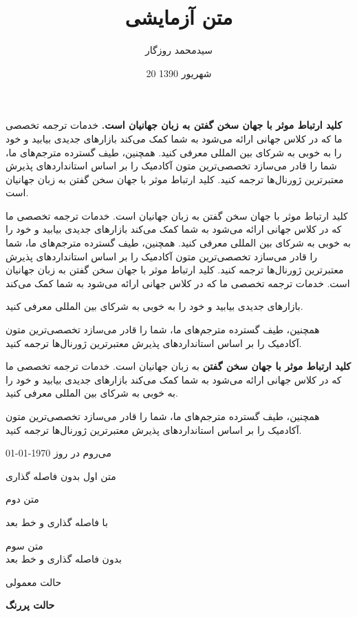 \documentclass[11pt]{article}
\title{متن آزمایشی}
\author{سیدمحمد روزگار}
\date{20 شهریور 1390}
\begin{document}
\maketitle
{} 

{\iransans \textbf{کلید ارتباط موثر با جهان سخن گفتن به زبان جهانیان است.}} خدمات ترجمه تخصصی ما که در کلاس جهانی ارائه می‌شود به شما کمک می‌کند بازارهای جدیدی بیابید و خود را به خوبی به شرکای بین المللی معرفی کنید. همچنین، طیف گسترده مترجم‌های ما، 
شما را قادر می‌سازد تخصصی‌ترین متون آکادمیک را بر اساس استانداردهای پذیرش معتبرترین ژورنال‌ها ترجمه کنید. کلید ارتباط موثر با جهان سخن گفتن به زبان جهانیان است. 

\begin{center}
	کلید ارتباط موثر با جهان سخن گفتن به زبان جهانیان است. خدمات ترجمه تخصصی ما که در کلاس جهانی ارائه می‌شود به شما کمک می‌کند بازارهای جدیدی بیابید و خود را به خوبی به شرکای بین المللی معرفی کنید. همچنین، طیف گسترده مترجم‌های ما، شما را قادر می‌سازد تخصصی‌ترین متون آکادمیک را بر اساس استانداردهای پذیرش معتبرترین ژورنال‌ها ترجمه کنید. کلید ارتباط موثر با جهان سخن گفتن به زبان جهانیان است. خدمات ترجمه تخصصی ما که در کلاس جهانی ارائه می‌شود به شما کمک می‌کند
\end{center} 

بازارهای جدیدی بیابید و {\tiny خود را به خوبی به شرکای} بین المللی معرفی کنید. 


\centerline{همچنین، طیف گسترده مترجم‌های ما، شما را قادر می‌سازد تخصصی‌ترین متون آکادمیک را بر اساس استانداردهای پذیرش معتبرترین ژورنال‌ها ترجمه کنید.} 

{\nast \textbf{کلید ارتباط موثر با جهان سخن گفتن}} به زبان جهانیان است. خدمات ترجمه تخصصی ما که در کلاس جهانی ارائه می‌شود به شما کمک می‌کند بازارهای جدیدی بیابید و خود را به خوبی به شرکای بین المللی معرفی کنید. 

\centering
همچنین، طیف گسترده مترجم‌های ما، شما را قادر می‌سازد تخصصی‌ترین متون آکادمیک را بر اساس استانداردهای پذیرش معتبرترین ژورنال‌ها ترجمه کنید.

 می‌روم در روز \today
 
 متن اول
 بدون فاصله گذاری
 
 متن دوم
 
با فاصله گذاری و خط بعد

متن سوم \\
بدون فاصله گذاری و خط بعد 

\textrm{حالت معمولی}

\textbf{حالت پررنگ}
\end{document}
